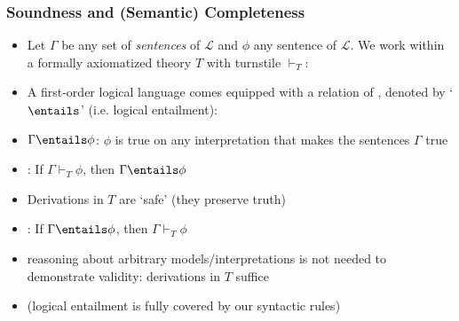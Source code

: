 \begin{frame}
\frametitle{Soundness and (Semantic) Completeness}

\begin{itemize}[<+->]

\item Let $\Gamma$ be any set of \textit{sentences} of $\mathcal{L}$ and $\phi$ any sentence of $\mathcal{L}$. We work within a formally axiomatized theory $T$ with turnstile $\vdash_T$:

\item A first-order logical language comes equipped with a relation of , denoted by `$\entails$' (i.e. logical entailment):
\item[] $\Gamma \entails \phi$: $\phi$ is true on any interpretation that makes the sentences $\Gamma$ true %


\medskip 

\item {}: If $\Gamma \vdash_T \phi$, then $\Gamma \entails \phi$

\bi 

\item Derivations in $T$ are `safe' (they preserve truth)


\ei

\bigskip 

\item {}: If $\Gamma \entails \phi$, then $\Gamma \vdash_{T} \phi$


\medskip 

\bi

\item reasoning about arbitrary models/interpretations is not needed to demonstrate validity: derivations in $T$ suffice 

\item (logical entailment is fully covered by our syntactic rules)


\ei

\end{itemize}
\end{frame}


